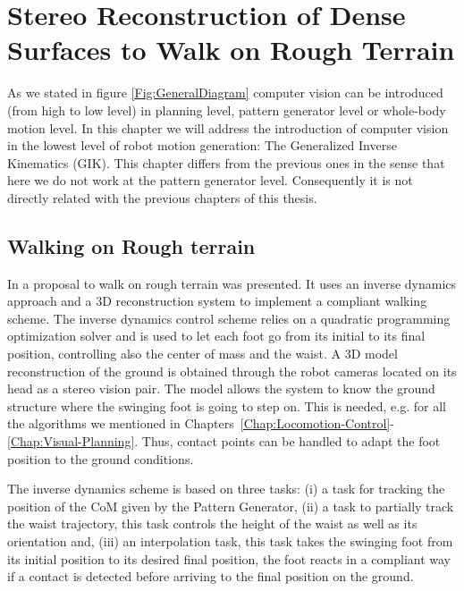 \chapter{Stereo Reconstruction of Dense Surfaces to Walk on Rough Terrain} 
\label{Chap:3DReconstruction}

As we stated in figure \ref{Fig:GeneralDiagram} computer vision can be introduced (from high to low level) in planning level, pattern generator level or whole-body motion level. In this chapter we will address the introduction of computer vision in the lowest level of robot motion generation: The Generalized Inverse Kinematics (GIK). This chapter differs from the previous ones in the sense that here we do not work at the pattern generator level. Consequently it is not directly related with the previous chapters of this thesis.

\section{Walking on Rough terrain}

In \citep{RamosIJHR2013} a proposal to walk on rough terrain was presented. It uses an inverse dynamics approach and a 3D reconstruction system to implement a compliant walking scheme. The inverse dynamics control scheme relies on a quadratic programming optimization solver and is used to let each foot go from its initial to its final position, controlling also the center of mass and the waist. A 3D model reconstruction of the ground is obtained through the robot cameras located on its head as a stereo vision pair. The model allows the system to know the ground structure where the swinging foot is going to step on. This is needed, e.g. for all the algorithms we mentioned in Chapters~\ref{Chap:Locomotion-Control}-\ref{Chap:Visual-Planning}. Thus, contact points can be handled to adapt the foot position to the ground conditions.

The inverse dynamics scheme is based on three tasks: (i) a task for tracking the position of the CoM given by the Pattern Generator, (ii) a task to partially track the waist trajectory, this task controls the height of the waist as well as its orientation and, (iii) an interpolation task, this task takes the swinging foot from its initial position to its desired final position, the foot reacts in a compliant way if a contact is detected before arriving to the final position on the ground.


